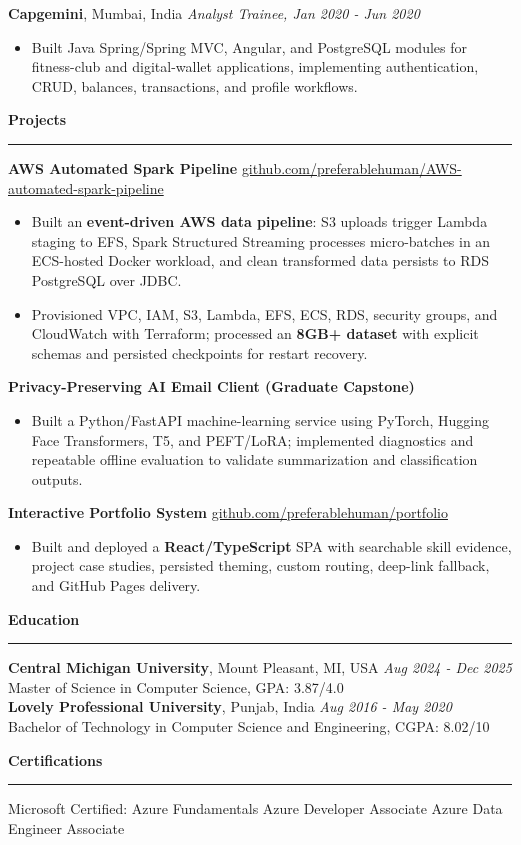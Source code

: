 \documentclass[11pt,letterpaper]{article}
\newcommand{\ressection}[1]{\Needspace{6\baselineskip}\vspace{8pt}\par\textbf{#1}\par\vspace{2pt}\hrule\vspace{5pt}}
\begin{document}
\textbf{Capgemini}, Mumbai, India \hfill \textit{Analyst Trainee, Jan 2020 - Jun 2020}
\begin{itemize}
  \item Built Java Spring/Spring MVC, Angular, and PostgreSQL modules for fitness-club and digital-wallet applications, implementing authentication, CRUD, balances, transactions, and profile workflows.
\end{itemize}

\ressection{Projects}
\textbf{AWS Automated Spark Pipeline} \hfill \href{https://github.com/preferablehuman/AWS-automated-spark-pipeline}{github.com/preferablehuman/AWS-automated-spark-pipeline}
\begin{itemize}
  \item Built an \textbf{event-driven AWS data pipeline}: S3 uploads trigger Lambda staging to EFS, Spark Structured Streaming processes micro-batches in an ECS-hosted Docker workload, and clean transformed data persists to RDS PostgreSQL over JDBC.
  \item Provisioned VPC, IAM, S3, Lambda, EFS, ECS, RDS, security groups, and CloudWatch with Terraform; processed an \textbf{8GB+ dataset} with explicit schemas and persisted checkpoints for restart recovery.
\end{itemize}
\vspace{2pt}
\textbf{Privacy-Preserving AI Email Client (Graduate Capstone)}
\begin{itemize}
  \item Built a Python/FastAPI machine-learning service using PyTorch, Hugging Face Transformers, T5, and PEFT/LoRA; implemented diagnostics and repeatable offline evaluation to validate summarization and classification outputs.
\end{itemize}
\vspace{2pt}
\textbf{Interactive Portfolio System} \hfill \href{https://github.com/preferablehuman/portfolio}{github.com/preferablehuman/portfolio}
\begin{itemize}
  \item Built and deployed a \textbf{React/TypeScript} SPA with searchable skill evidence, project case studies, persisted theming, custom routing, deep-link fallback, and GitHub Pages delivery.
\end{itemize}

\ressection{Education}
\textbf{Central Michigan University}, Mount Pleasant, MI, USA \hfill \textit{Aug 2024 - Dec 2025}\\
Master of Science in Computer Science, GPA: 3.87/4.0\\
\textbf{Lovely Professional University}, Punjab, India \hfill \textit{Aug 2016 - May 2020}\\
Bachelor of Technology in Computer Science and Engineering, CGPA: 8.02/10

\ressection{Certifications}
Microsoft Certified: Azure Fundamentals \textbar{} Azure Developer Associate \textbar{} Azure Data Engineer Associate
\end{document}
